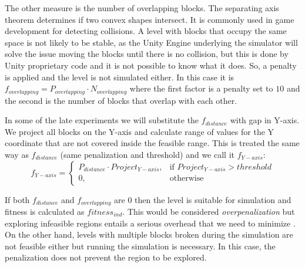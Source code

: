\documentclass[sigconf]{acmart}
\begin{document}
The other measure is the number of overlapping blocks. The separating axis 
theorem \cite{ericson2004real} determines if two convex shapes intersect. It is 
commonly used in game development for detecting collisions. A level with blocks 
that occupy the same space is not likely to be stable, as the Unity
Engine underlying the simulator will solve the issue moving the blocks until there is no collision, but this is done by Unity proprietary code and it is not possible to know what it does.
So, a penalty is applied and the level is not simulated either. 
In this case it is $f_{overlapping} = P_{overlapping} \cdot N_{overlapping}$ 
where the first factor is a penalty set to $10$ and the second is the number of 
blocks that overlap with each other.

In some of the late experiments we will substitute the $f_{distance}$ with gap in Y-axis.
We project all blocks on the Y-axis and calculate range of values for the Y coordinate
that are not covered inside the feasible range. This is treated the same way as $f_{distance}$
(same penalization and threshold) and we call it $f_{Y-axis}$:
$$f_{Y-axis} = 
\begin{cases}
P_{distance}\cdot Project_{Y-axis}, & \text{if } Project_{Y-axis} > threshold\\
0, & \text{otherwise}
\end{cases}
$$

If both $f_{distance}$ and $f_{overlapping}$ are $0$ then the level is suitable 
for simulation and fitness is calculated as $fitness_{ind}$. This would be 
considered \textit{overpenalization} but exploring infeasible regions entails a 
serious overhead that we need to minimize \cite{runarsson2003evolutionary}. 
On the other hand, levels with 
multiple blocks broken during the simulation are not feasible either but 
running the simulation is necessary. In this case, the penalization does not 
prevent the region to be explored.

\end{document}
